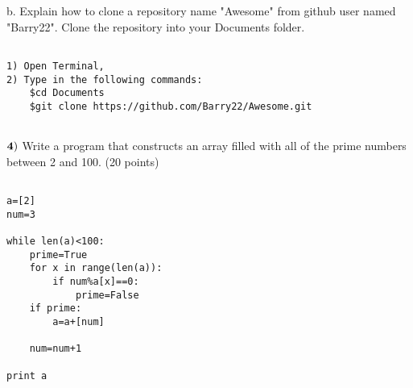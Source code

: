 \documentclass{article}
\begin{document}
  b.  Explain how to clone a repository name "Awesome" from github user named "Barry22".  Clone the repository into your Documents folder.
  \begin{verbatim}

1) Open Terminal,
2) Type in the following commands:
    $cd Documents
    $git clone https://github.com/Barry22/Awesome.git
  
  \end{verbatim}   
  
  \newpage
  
  $\bf{4)}$ Write a program that constructs an array filled with all of the prime numbers between 2 and 100. (20 points)
  
  \begin{verbatim}
  
a=[2]
num=3

while len(a)<100:
    prime=True
    for x in range(len(a)):
        if num%a[x]==0:
            prime=False
    if prime:
        a=a+[num]

    num=num+1

print a
  
  \end{verbatim}
  
  

 
\end{document}
